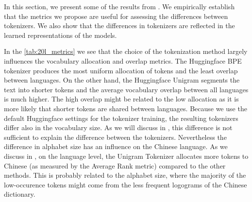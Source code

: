 In this section, we present some of the results from \citet{limisiewicz_tokenization_2023}. We empirically establish that the metrics we propose are useful for assessing the differences between tokenizers. We also show that the differences in tokenizers are reflected in the learned representations of the models. 




In the \autoref{tab:20l_metrics} we see that the choice of the tokenization method largely influences the vocabulary allocation and overlap metrics. The Huggingface BPE tokenizer produces the most uniform allocation of tokens and the least overlap between languages. On the other hand, the Huggingface Unigram segments the text into shorter tokens and the average vocabulary overlap between all languages is much higher. The high overlap might be related to the low allocation as it is more likely that shorter tokens are shared between languages. Because we use the default Huggingface settings for the tokenizer training, the resulting tokenizers differ also in the vocabulary size. As we will discuss in , this difference is not sufficient to explain the difference between the tokenizers. Nevertheless the difference in alphabet size has an influence on the Chinese language. As we discuss in \citet{limisiewicz_tokenization_2023}, on the language level, the Unigram Tokenizer allocates more tokens to Chinese (as measured by the Average Rank metric) compared to the other methods. This is probably related to the alphabet size, where the majority of the low-occurence tokens might come from the less frequent logograms of the Chinese dictionary.

